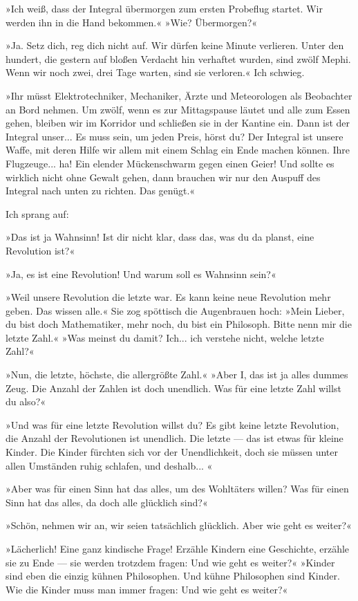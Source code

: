 »Ich weiß, dass der Integral übermorgen zum ersten Probeflug
startet. Wir werden ihn in die Hand bekommen.« »Wie? Übermorgen?«

»Ja. Setz dich, reg dich nicht auf. Wir dürfen keine Minute
verlieren. Unter den hundert, die gestern auf blo­ßen Verdacht hin
verhaftet wurden, sind zwölf Mephi. Wenn wir noch zwei, drei Tage
warten, sind sie verloren.« Ich schwieg.

»Ihr müsst Elektrotechniker, Mechaniker, Ärzte und Meteorologen als
Beobachter an Bord nehmen. Um zwölf, wenn es zur Mittagspause
läutet und alle zum Essen gehen, bleiben wir im Korridor und
schließen sie in der Kantine ein. Dann ist der Integral unser... Es
muss sein, um jeden Preis, hörst du? Der Integral ist unsere Waffe,
mit deren Hilfe wir allem mit einem Schlag ein Ende machen können.
Ihre Flugzeuge... ha! Ein elender Mückenschwarm gegen einen Geier!
Und sollte es wirklich nicht ohne Gewalt gehen, dann brauchen wir
nur den Auspuff des Integral nach unten zu richten. Das genügt.«

Ich sprang auf:

»Das ist ja Wahnsinn! Ist dir nicht klar, dass das, was du da
planst, eine Revolution ist?«

»Ja, es ist eine Revolution! Und warum soll es Wahnsinn sein?«

»Weil unsere Revolution die letzte war. Es kann keine neue
Revolution mehr geben. Das wissen alle.« Sie zog spöttisch die
Augenbrauen hoch: »Mein Lieber, du bist doch Mathematiker, mehr
noch, du bist ein Philosoph. Bitte nenn mir die letzte Zahl.« »Was
meinst du damit? Ich... ich verstehe nicht, welche letzte Zahl?«

»Nun, die letzte, höchste, die allergrößte Zahl.« »Aber I, das ist
ja alles dummes Zeug. Die Anzahl der Zahlen ist doch unendlich. Was
für eine letzte Zahl willst du also?«

»Und was für eine letzte Revolution willst du? Es gibt keine letzte
Revolution, die Anzahl der Revolutionen ist unendlich. Die letzte —
das ist etwas für kleine Kinder. Die Kinder fürchten sich vor der
Unendlichkeit, doch sie müssen unter allen Umständen ruhig
schlafen, und deshalb... «

»Aber was für einen Sinn hat das alles, um des Wohltäters willen?
Was für einen Sinn hat das alles, da doch alle glücklich sind?«

»Schön, nehmen wir an, wir seien tatsächlich glücklich. Aber wie
geht es weiter?«

»Lächerlich! Eine ganz kindische Frage! Erzähle Kindern eine
Geschichte, erzähle sie zu Ende — sie werden trotzdem fragen: Und
wie geht es weiter?« »Kinder sind eben die einzig kühnen
Philosophen. Und kühne Philosophen sind Kinder. Wie die Kinder muss
man immer fragen: Und wie geht es weiter?«

